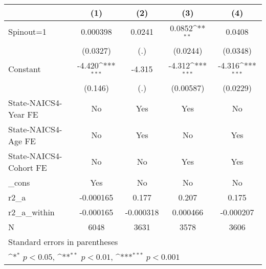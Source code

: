 {
\def\sym#1{\ifmmode^{#1}\else\(^{#1}\)\fi}
\begin{tabular}{l*{4}{c}}
\hline\hline
                    &\multicolumn{1}{c}{(1)}         &\multicolumn{1}{c}{(2)}         &\multicolumn{1}{c}{(3)}         &\multicolumn{1}{c}{(4)}         \\
\hline
Spinout=1           &    0.000398         &      0.0241         &      0.0852\sym{**} &      0.0408         \\
                    &    (0.0327)         &         (.)         &    (0.0244)         &    (0.0348)         \\
[1em]
Constant            &      -4.420\sym{***}&      -4.315         &      -4.312\sym{***}&      -4.316\sym{***}\\
                    &     (0.146)         &         (.)         &   (0.00587)         &    (0.0229)         \\
[1em]
State-NAICS4-Year FE&          No         &         Yes         &         Yes         &          No         \\
[1em]
State-NAICS4-Age FE &          No         &         Yes         &          No         &         Yes         \\
[1em]
State-NAICS4-Cohort FE&          No         &          No         &         Yes         &         Yes         \\
[1em]
\_cons              &         Yes         &          No         &          No         &          No         \\
\hline
r2\_a                &   -0.000165         &       0.177         &       0.207         &       0.175         \\
r2\_a\_within         &   -0.000165         &   -0.000318         &    0.000466         &   -0.000207         \\
N                   &        6048         &        3631         &        3578         &        3606         \\
\hline\hline
\multicolumn{5}{l}{\footnotesize Standard errors in parentheses}\\
\multicolumn{5}{l}{\footnotesize \sym{*} \(p<0.05\), \sym{**} \(p<0.01\), \sym{***} \(p<0.001\)}\\
\end{tabular}
}
